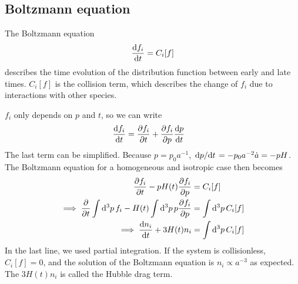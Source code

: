 \subsection{Boltzmann equation}
\label{ssec:boltzmann}
The Boltzmann equation
\begin{align*}
	\dv{f_i}{t} = C_i[f]
\end{align*}
describes the time evolution of the distribution function between early and late times. $C_i[f]$ is the collision term, which describes the change of $f_i$ due to interactions with other species.

$f_i$ only depends on $p$ and $t$, so we can write
\begin{align*}
	\dv{f_i}{t} &= \pdv{f_i}{t} + \pdv{f_i}{p} \dv{p}{t}
\end{align*}
The last term can be simplified. Because $p = p_0 a^{-1}$, $\dv*{p}{t} = -p_0 a^{-2} \dot{a} = - p H$. The Boltzmann equation for a homogeneous and isotropic case then becomes
\begin{align*}
	\pdv{f_i}{t} - p H(t) \pdv{f_i}{p} &= C_i[f]\\
	\implies \pdv{}{t} \int \dd{^3 p} f_i - H(t) \int \dd{^3 p} p \pdv{f_i}{p} &= \int \dd{^3 p} C_i[f]\\
	\implies \dv{n_i}{t} + 3 H(t) n_i &= \int \dd{^3 p} C_i[f]
\end{align*}
In the last line, we used partial integration.
If the system is collisionless, $C_i[f]=0$, and the solution of the Boltzmann equation is $n_i \propto a^{-3}$ as expected. The $3H(t) n_i$ is called the Hubble drag term.

